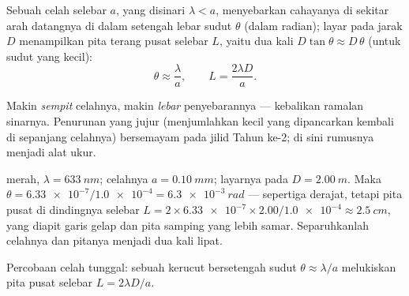 \begin{proposition}\label{prop:g12:light-as-wave:halfwidth}
Sebuah celah selebar $a$, yang disinari 
$\lambda < a$, menyebarkan cahayanya di sekitar arah datangnya di dalam
setengah lebar sudut $\theta$ (dalam radian); layar pada jarak $D$
menampilkan pita terang pusat selebar $L$, yaitu dua kali
$D \tan\theta \approx D\,\theta$ (untuk sudut yang kecil):
\[
\theta \approx \frac{\lambda}{a}, \qquad L = \frac{2\lambda D}{a}.
\]
\end{proposition}
\admitted

\begin{remark}\label{rem:g12:light-as-wave:honest}
Makin \emph{sempit} celahnya, makin \emph{lebar} penyebarannya ---
kebalikan ramalan sinarnya. Penurunan yang jujur (menjumlahkan 
kecil yang dipancarkan kembali di sepanjang celahnya) bersemayam pada
jilid Tahun ke-2; di sini rumusnya menjadi alat ukur.
\end{remark}

\begin{example}\label{ex:g12:light-as-wave:slit}
 merah, $\lambda = \qty{633}{nm}$; celahnya
$a = \qty{0.10}{mm}$; layarnya pada $D = \qty{2.00}{m}$. Maka
$\theta = \num{6.33e-7} /
\num{1.0e-4} = \qty{6.3e-3}{rad}$ ---
sepertiga derajat, tetapi pita pusat di dindingnya selebar
$L = 2 \times \num{6.33e-7} \times 2.00 /
\num{1.0e-4} \approx \qty{2.5}{cm}$, yang diapit garis gelap dan pita samping yang lebih
samar. Separuhkanlah celahnya dan pitanya menjadi dua kali lipat.
\end{example}

\begin{omfigure}

{\small Percobaan celah tunggal: sebuah kerucut bersetengah sudut
$\theta
\approx \lambda/a$ melukiskan pita pusat selebar
$L = 2\lambda D/a$.}
\end{omfigure}

